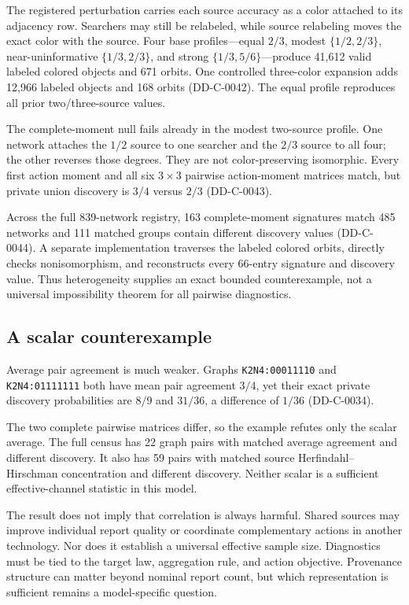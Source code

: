 \documentclass[11pt]{article}
\theoremstyle{remark}
\begin{document}
The registered perturbation carries each source accuracy as a color attached to
its adjacency row. Searchers may still be relabeled, while source relabeling moves
the exact color with the source. Four base profiles---equal $2/3$, modest
$\{1/2,2/3\}$, near-uninformative $\{1/3,2/3\}$, and strong
$\{1/3,5/6\}$---produce 41,612 valid labeled colored objects and 671 orbits. One
controlled three-color expansion adds 12,966 labeled objects and 168 orbits
(DD-C-0042). The equal profile reproduces all prior two/three-source values.

The complete-moment null fails already in the modest two-source profile. One
network attaches the $1/2$ source to one searcher and the $2/3$ source to all four;
the other reverses those degrees. They are not color-preserving isomorphic. Every
first action moment and all six $3\times3$ pairwise action-moment matrices match,
but private union discovery is $3/4$ versus $2/3$ (DD-C-0043).



Across the full 839-network registry, 163 complete-moment signatures match 485
networks and 111 matched groups contain different discovery values (DD-C-0044).
A separate implementation traverses the labeled colored orbits, directly checks
nonisomorphism, and reconstructs every 66-entry signature and discovery value.
Thus heterogeneity supplies an exact bounded counterexample, not a universal
impossibility theorem for all pairwise diagnostics.

\subsection{A scalar counterexample}

Average pair agreement is much weaker. Graphs \texttt{K2N4:00011110} and
\texttt{K2N4:01111111} both have mean pair agreement $3/4$, yet their exact private
discovery probabilities are $8/9$ and $31/36$, a difference of $1/36$
(DD-C-0034).



The two complete pairwise matrices differ, so the example refutes only the scalar
average. The full census has 22 graph pairs with matched average agreement and
different discovery. It also has 59 pairs with matched source Herfindahl--
Hirschman concentration and different discovery. Neither scalar is a sufficient
effective-channel statistic in this model.

The result does not imply that correlation is always harmful. Shared sources may
improve individual report quality or coordinate complementary actions in another
technology. Nor does it establish a universal effective sample size. Diagnostics
must be tied to the target law, aggregation rule, and action objective. Provenance
structure can matter beyond nominal report count, but which representation is
sufficient remains a model-specific question.
\end{document}
